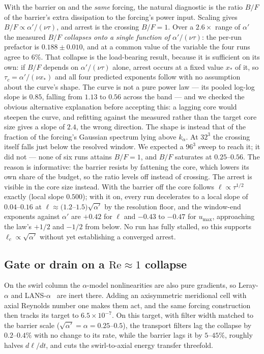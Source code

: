 \documentclass[11pt,a4paper]{article}
\begin{document}
With the barrier on and the \emph{same} forcing, the natural diagnostic is the ratio $B/F$ of the
barrier's extra dissipation to the forcing's power input. Scaling gives $B/F\propto\alpha'/(\nu\tau)$,
and arrest is the crossing $B/F=1$. Over a $2.6\times$ range of $\alpha'$ the measured $B/F$
\emph{collapses onto a single function of $\alpha'/(\nu\tau)$}: the per-run prefactor is
$0.188\pm0.010$, and at a common value of the variable the four runs agree to $6\%$. That collapse
is the load-bearing result, because it is sufficient on its own: if $B/F$ depends on
$\alpha'/(\nu\tau)$ alone, arrest occurs at a fixed value $x_*$ of it, so $\tau_c=\alpha'/(\nu x_*)$
and all four predicted exponents follow with no assumption about the curve's shape. The curve is not
a pure power law --- its pooled log-log slope is $0.85$, falling from $1.13$ to $0.56$ across the
band --- and we checked the obvious alternative explanation before accepting this: a lagging core
would steepen the curve, and refitting against the measured rather than the target core size gives a
slope of $2.4$, the wrong direction. The shape is instead that of the fraction of the forcing's
Gaussian spectrum lying above $k_\alpha$. At $32^3$ the crossing itself falls just below the
resolved window. We expected a $96^3$ sweep to reach it; it did not --- none of six runs attains
$B/F=1$, and $B/F$ saturates at $0.25$--$0.56$. The reason is informative: the barrier resists by
fattening the core, which lowers its own share of the budget, so the ratio levels off instead of
crossing. The arrest is visible in the core size instead. With the barrier off the core follows
$\ell\propto\tau^{1/2}$ exactly (local slope $0.500$); with it on, every run decelerates to a local
slope of $0.04$--$0.16$ at $\ell\approx(1.2$--$1.5)\sqrt{\alpha'}$ by the resolution floor, and the
window-end exponents against $\alpha'$ are $+0.42$ for $\ell$ and $-0.43$ to $-0.47$ for $u_{\max}$,
approaching the law's $+1/2$ and $-1/2$ from below. No run has fully stalled, so this supports
$\ell_c\propto\sqrt{\alpha'}$ without yet establishing a converged arrest.

\subsection{Gate or drain on a \texorpdfstring{$\mathrm{Re}\approx1$}{Re~1} collapse}
\label{sec:gate-drain}

On the swirl column the $\alpha$-model nonlinearities are also pure gradients, so Leray-$\alpha$ and
LANS-$\alpha$~\cite{HolmMarsdenRatiu1998} are inert there. Adding an axisymmetric meridional cell
with axial Reynolds number one makes them act, and the same forcing construction then tracks its
target to $6.5\times10^{-7}$. On this target, with filter width matched to the barrier scale
($\sqrt{\alpha'}=\alpha=0.25$--$0.5$), the transport filters lag the collapse by $0.2$--$0.4\%$ with
no change to its rate, while the barrier lags it by $5$--$45\%$, roughly halves $d\ell/dt$, and cuts
the swirl-to-axial energy transfer threefold.
\end{document}
